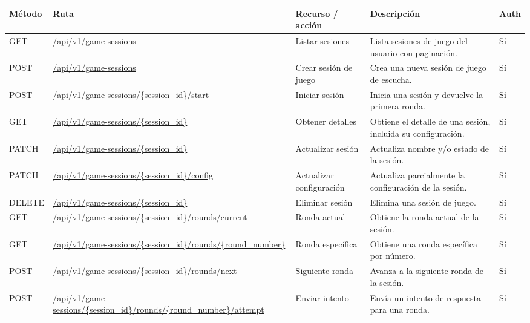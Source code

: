 \begin{table}[H]
\centering
\footnotesize
\setlength{\tabcolsep}{4pt}
\renewcommand{\arraystretch}{1.25}
\begin{tabular}{|p{1.4cm}|p{4.1cm}|p{3.2cm}|p{5.8cm}|p{1cm}|}
\hline
\textbf{Método} & \textbf{Ruta} & \textbf{Recurso / acción} &
\textbf{Descripción} & \textbf{Auth} \\
\hline

GET & \url{/api/v1/game-sessions} & Listar sesiones &
Lista sesiones de juego del usuario con paginación. &
Sí \\
\hline

POST & \url{/api/v1/game-sessions} & Crear sesión de juego &
Crea una nueva sesión de juego de escucha. &
Sí \\
\hline

POST & \url{/api/v1/game-sessions/{session\_id}/start} & Iniciar sesión &
Inicia una sesión y devuelve la primera ronda. &
Sí \\
\hline

GET & \url{/api/v1/game-sessions/{session\_id}} & Obtener detalles &
Obtiene el detalle de una sesión, incluida su configuración. &
Sí \\
\hline

PATCH & \url{/api/v1/game-sessions/{session\_id}} & Actualizar sesión &
Actualiza nombre y/o estado de la sesión. &
Sí \\
\hline

PATCH & \url{/api/v1/game-sessions/{session\_id}/config} & Actualizar configuración &
Actualiza parcialmente la configuración de la sesión. &
Sí \\
\hline

DELETE & \url{/api/v1/game-sessions/{session\_id}} & Eliminar sesión &
Elimina una sesión de juego. &
Sí \\
\hline

GET & \url{/api/v1/game-sessions/{session\_id}/rounds/current} & Ronda actual &
Obtiene la ronda actual de la sesión. &
Sí \\
\hline

GET & \url{/api/v1/game-sessions/{session\_id}/rounds/{round\_number}} & Ronda específica &
Obtiene una ronda específica por número. &
Sí \\
\hline

POST & \url{/api/v1/game-sessions/{session\_id}/rounds/next} & Siguiente ronda &
Avanza a la siguiente ronda de la sesión. &
Sí \\
\hline

POST & \url{/api/v1/game-sessions/{session\_id}/rounds/{round\_number}/attempt} &
Enviar intento &
Envía un intento de respuesta para una ronda. &
Sí \\
\hline


\end{tabular}
\end{table}
